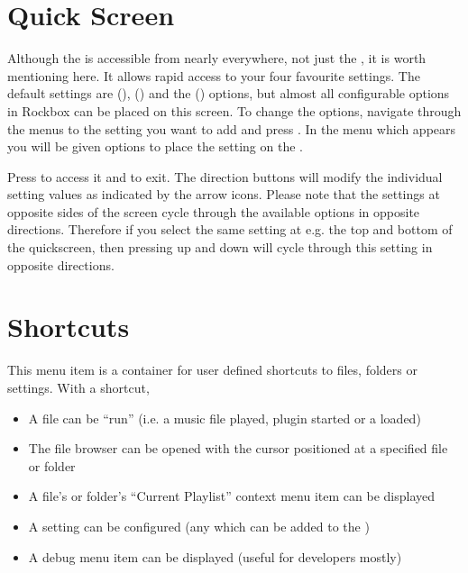 
{
\section{\label{ref:QuickScreen}Quick Screen}
  Although the  is accessible from nearly everywhere,
  not just the , it is worth mentioning here.  It allows
  rapid access to your four favourite settings.  The default settings are
   (),
   () and the
   () options, but almost all
  configurable options in Rockbox can be placed on this screen.  To change the
  options, navigate through the menus to the setting you want to add and press
  \ActionStdContext.  In the menu which appears you will be given options
  to place the setting on the .
  
  Press \ActionStdQuickScreen{} to access it and \ActionQuickScreenExit{} to exit.
  The direction buttons will modify the individual setting values as indicated 
  by the arrow icons. Please note that the settings at opposite sides of the
   screen cycle through the available options in opposite directions.
   Therefore if you select the same setting at e.g. the top and bottom of the
   quickscreen, then pressing up and down will cycle through this setting in
   opposite directions.
}

\section{\label{ref:MainMenuShortcuts}Shortcuts}

This menu item is a container for user defined shortcuts to files, folders or
settings. With a shortcut,
\begin{itemize}
  \item A file can be ``run'' (i.e. a music file played, plugin started or
        a  loaded)
  \item The file browser can be opened with the cursor positioned at
        a specified file or folder
  \item A file's or folder's ``Current Playlist'' context menu item can
        be displayed
  \item A setting can be configured (any which can be added to the
        )
  \item A debug menu item can be displayed (useful for developers mostly)
\end{itemize}

